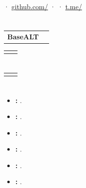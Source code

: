 \documentclass[10pt,a4paper]{article}
\makeatletter
\newcommand{\entry}[3]{%
  \noindent\begin{tabularx}{\textwidth}{@{}Xr@{}}
    \textbf{#1} & \textcolor{muted}{#2}
  \end{tabularx}\par
  \vspace{1pt}
  #3\par\vspace{3pt}
}
\makeatother
\begin{document}
\selectlanguage{\ResumeDocumentLanguage}
\raggedright

\begin{minipage}{\textwidth}
{\LARGE\bfseries \ResumeName}\par
\vspace{3pt}
{\large\color{accent} \ResumeHeadline}\par
\vspace{6pt}
\href{mailto:\ResumeEmail}{\ResumeEmail}
\quad·\quad
\href{\ResumeGitHubUrl}{github.com/\ResumeGitHubHandle}
\quad·\quad
\href{\ResumeGiteaUrl}{\ResumeGiteaHandle}
\quad·\quad
\href{\ResumeTelegramUrl}{t.me/\ResumeTelegramHandle}
\end{minipage}\par

\section{\ResumeSummarySection}
\ResumeSummaryText

\section{\ResumeExperienceSection}
\entry{BaseALT}{\ResumeBaseAltDate}{\ResumeBaseAltDescription}
\entry{\ResumeYandexRole}{\ResumeYandexDate}{\ResumeYandexDescription}

\section{\ResumeEducationSection}
\entry{\ResumeUniversityName}{\ResumeEducationDate}{\ResumeEducationDescription}

\section{\ResumeSkillsSection}
\begin{itemize}
  \item \textbf{\ResumeLinuxSkillLabel:} \ResumeLinuxSkillText.
  \item \textbf{\ResumeContainersSkillLabel:} \ResumeContainersSkillText.
  \item \textbf{\ResumeCiSkillLabel:} \ResumeCiSkillText.
  \item \textbf{\ResumeObservabilitySkillLabel:} \ResumeObservabilitySkillText.
  \item \textbf{\ResumeDevelopmentSkillLabel:} \ResumeDevelopmentSkillText.
  \ifdefined\ResumeLanguagesSkillLabel
    \item \textbf{\ResumeLanguagesSkillLabel:} \ResumeLanguagesSkillText.
  \fi
\end{itemize}
\end{document}
